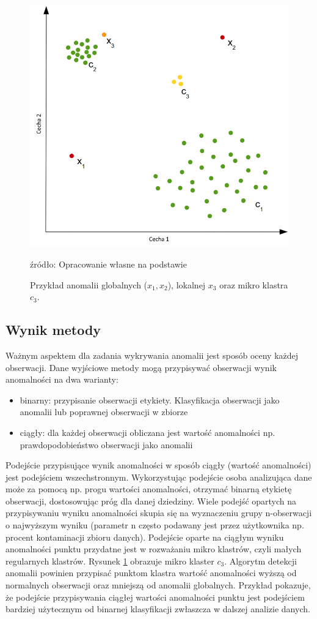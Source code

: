 \begin{figure}[h]
    \centering
    \includegraphics[width=.65\textwidth]{chapters/istniejace/images/mikro_cluste.png}
    \caption{Przykład anomalii globalnych ($x_1, x_2$), lokalnej $x_3$ oraz mikro klastra $c_3$. }
    \footnotesize{źródło: Opracowanie własne na podstawie \cite{goldstein2016comparative}}
    \label{fig:anomalie_glob_lok}
\end{figure}

\subsection{Wynik metody}
\label{sec:score}
Ważnym aspektem dla zadania wykrywania anomalii jest sposób oceny każdej obserwacji. Dane wyjściowe metody mogą przypisywać obserwacji wynik anomalności na dwa warianty:
\begin{itemize}
    \item binarny: przypisanie obserwacji etykiety. Klasyfikacja obserwacji jako anomalii lub poprawnej obserwacji w zbiorze
    \item ciągły: dla każdej obserwacji obliczana jest wartość anomalności np. prawdopodobieństwo obserwacji jako anomalii
\end{itemize}
Podejście przypisujące wynik anomalności w sposób ciągły (wartość anomalności) jest podejściem wszechstronnym. Wykorzystując podejście osoba analizująca dane może za pomocą np. progu wartości anomalności, otrzymać binarną etykietę obserwacji, dostosowując próg dla danej dziedziny.
Wiele podejść opartych na przypisywaniu wyniku anomalności skupia się na wyznaczeniu grupy n-obserwacji o najwyższym wyniku (parametr n często podawany jest przez użytkownika np. procent kontaminacji zbioru danych). 
Podejście oparte na ciągłym wyniku anomalności punktu przydatne jest w rozważaniu mikro klastrów, czyli małych regularnych klastrów. Rysunek \ref{fig:anomalie_glob_lok} obrazuje mikro klaster $c_3$. Algorytm detekcji anomalii powinien przypisać punktom klastra wartość anomalności wyższą od normalnych obserwacji oraz mniejszą od anomalii globalnych. Przykład pokazuje, że podejście przypisywania ciągłej wartości anomalności punktu jest podejściem bardziej użytecznym od binarnej klasyfikacji zwłaszcza w dalszej analizie danych. 


